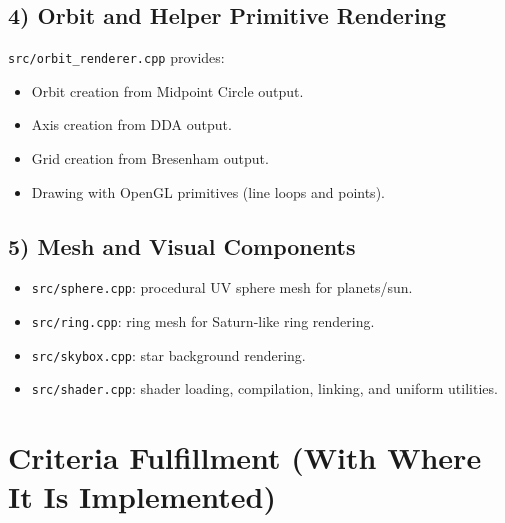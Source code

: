 \documentclass[11pt,a4paper]{article}
\begin{document}
\subsection{4) Orbit and Helper Primitive Rendering}
\texttt{src/orbit\_renderer.cpp} provides:
\begin{itemize}[leftmargin=*]
    \item Orbit creation from Midpoint Circle output.
    \item Axis creation from DDA output.
    \item Grid creation from Bresenham output.
    \item Drawing with OpenGL primitives (line loops and points).
\end{itemize}

\subsection{5) Mesh and Visual Components}
\begin{itemize}[leftmargin=*]
    \item \texttt{src/sphere.cpp}: procedural UV sphere mesh for planets/sun.
    \item \texttt{src/ring.cpp}: ring mesh for Saturn-like ring rendering.
    \item \texttt{src/skybox.cpp}: star background rendering.
    \item \texttt{src/shader.cpp}: shader loading, compilation, linking, and uniform utilities.
\end{itemize}

\section{Criteria Fulfillment (With Where It Is Implemented)}
\end{document}
